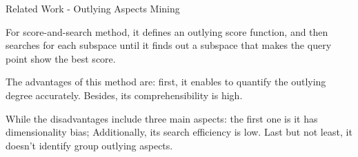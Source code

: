 \documentclass[
size=14pt,
paper=smartboard,  %
mode=present, 		%
display=slides, 	%
style=tuliplab,  	%
pauseslide,
fleqn,leqno]{powerdot}
\begin{document}
\begin{slide}[toc=,bm=]{Related Work - Outlying Aspects Mining}
\begin{itemize}
{\begin{itemize}
				\end{itemize}
			}
		\end{itemize}
		
		\begin{note}
			For score-and-search method,
			it defines an outlying score function,
			and then searches for each subspace until it finds out a subspace that
			makes the query point show the best score.
			
			The advantages of this method are:
			first, it enables to quantify the outlying degree accurately.
			Besides, its comprehensibility is high.
			
			While the disadvantages include three main aspects:
			the first one is it has dimensionality bias;
			Additionally, its search efficiency is low.
			Last but not least, it doesn't identify group outlying aspects.
		\end{note}
		
	\end{slide}
	
\end{document}
